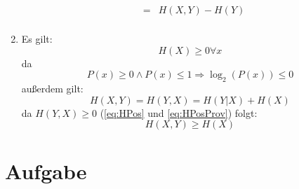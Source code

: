 \documentclass[DIN, pagenumber=false, fontsize=11pt, parskip=half]{scrartcl}
\begin{document}
\begin{enumerate}[label=\alph*)]
\begin{eqnarray*}
                       &=& H(X,Y) - H(Y)\\
            \end{eqnarray*}
        \item
            Es gilt:
            \begin{equation} \label{eq:HPos}
                H(X) \geq 0 \forall x
            \end{equation}
            da
            \begin{equation} \label{eq:HPosProv}
                P(x) \geq 0 \land P(x) \leq 1 \Rightarrow \log_2(P(x)) \leq 0
            \end{equation} 
            außerdem gilt:
            \begin{equation}
                H(X, Y) = H(Y, X) = H(Y|X) + H(X)
            \end{equation}
            da $H(Y,X) \geq 0$ (\ref{eq:HPos} und \ref{eq:HPosProv}) folgt:
            \begin{equation}
                H(X, Y) \geq H(X)
            \end{equation}
    \end{enumerate}

    \section{Aufgabe}
\end{document}
